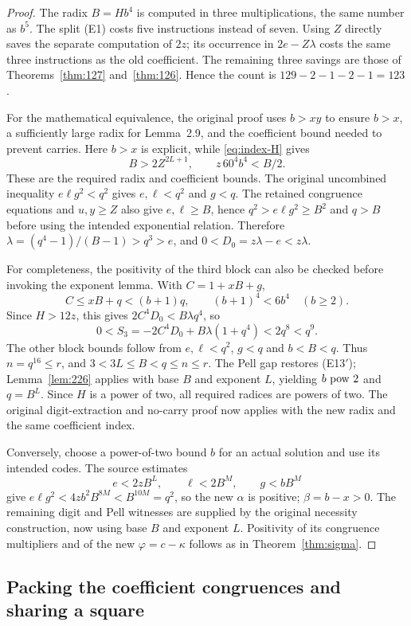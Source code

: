 \begin{proof}
The radix $B=Hb^4$ is computed in three multiplications, the same number
as $b^5$. The split (E1) costs five instructions instead of seven.
Using $Z$ directly saves the separate computation of $2z$; its occurrence
in $2e-Z\lambda$ costs the same three instructions as the old coefficient.
The remaining three savings are those of Theorems~\ref{thm:127}
and~\ref{thm:126}. Hence the count is $129-2-1-2-1=123$.

For the mathematical equivalence, the original proof uses $b>xy$ to
ensure $b>x$, a sufficiently large radix for Lemma~2.9, and the coefficient
bound needed to prevent carries. Here $b>x$ is explicit, while
\eqref{eq:index-H} gives
\[
 B>2Z^{2L+1},\qquad z\,60^4b^4<B/2.
\]
These are the required radix and coefficient bounds. The original
uncombined inequality $e\ell g^2<q^2$ gives $e,\ell<q^2$ and $g<q$.
The retained congruence equations and $u,y\ge Z$ also give
$e,\ell\ge B$, hence $q^2>e\ell g^2\ge B^2$ and $q>B$ before using the
intended exponential relation. Therefore $\lambda=(q^4-1)/(B-1)>q^3>e$, and
$0<D_0=z\lambda-e<z\lambda$.

For completeness, the positivity of the third block can also be checked
before invoking the exponent lemma. With $C=1+xB+g$,
\[
 C\le xB+q<(b+1)q,
 \qquad (b+1)^4<6b^4\quad(b\ge2).
\]
Since $H>12z$, this gives
$2C^4D_0<B\lambda q^4$, so
\[
 0<S_3=-2C^4D_0+B\lambda(1+q^4)<2q^8<q^9.
\]
The other block bounds follow from $e,\ell<q^2$, $g<q$ and $b<B<q$.
Thus $n=q^{16}\le r$, and $3<3L\le B<q\le n\le r$.
The Pell gap restores (E13$'$); Lemma~\ref{lem:226} applies with base
$B$ and exponent $L$, yielding $b\ \mathrm{pow}\ 2$ and $q=B^L$. Since $H$ is a
power of two, all required radices are powers of two. The original
digit-extraction and no-carry proof now applies with the new radix and
the same coefficient index.

Conversely, choose a power-of-two bound $b$ for an actual solution and
use its intended codes. The source estimates
\[
 e<2zB^L,\qquad \ell<2B^M,\qquad g<bB^M
\]
give $e\ell g^2<4zb^2B^{8M}<B^{10M}=q^2$, so the new
$\alpha$ is positive; $\beta=b-x>0$. The remaining digit and Pell
witnesses are supplied by the original necessity construction, now using
base $B$ and exponent $L$. Positivity of its congruence multipliers and
of the new $\varphi=c-\kappa$ follows as in Theorem~\ref{thm:sigma}.
\end{proof}

\subsection{Packing the coefficient congruences and sharing a square}

